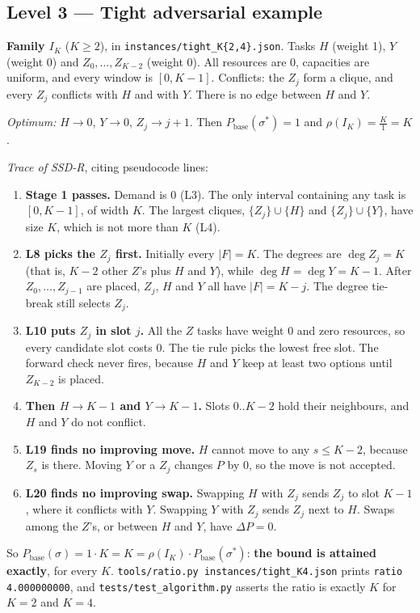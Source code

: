 \subsection{Level 3 --- Tight adversarial example}
\textbf{Family $I_K$} ($K\ge2$), in \texttt{instances/tight\_K\{2,4\}.json}.
Tasks $H$ (weight 1), $Y$ (weight 0) and $Z_0,\dots,Z_{K-2}$ (weight 0).
All resources are $0$, capacities are uniform, and every window is
$[0,K-1]$. Conflicts: the $Z_j$ form a clique, and every $Z_j$ conflicts
with $H$ and with $Y$. There is no edge between $H$ and $Y$.

\emph{Optimum:} $H\to0$, $Y\to0$, $Z_j\to j{+}1$. Then
$P_{\text{base}}(\sigma^\ast)=1$ and $\rho(I_K)=\frac{K}{1}=K$.

\emph{Trace of SSD-R}, citing pseudocode lines:
\begin{enumerate}
\item \textbf{Stage 1 passes.} Demand is 0 (L3). The only interval
  containing any task is $[0,K-1]$, of width $K$. The largest cliques,
  $\{Z_j\}\cup\{H\}$ and $\{Z_j\}\cup\{Y\}$, have size $K$, which is not
  more than $K$ (L4).
\item \textbf{L8 picks the $Z_j$ first.} Initially every $|F|=K$. The
  degrees are $\deg Z_j=K$ (that is, $K{-}2$ other $Z$'s plus $H$ and $Y$),
  while $\deg H=\deg Y=K-1$. After $Z_0,\dots,Z_{j-1}$ are placed, $Z_j$,
  $H$ and $Y$ all have $|F|=K-j$. The degree tie-break still selects
  $Z_j$.
\item \textbf{L10 puts $Z_j$ in slot $j$.} All the $Z$ tasks have weight 0
  and zero resources, so every candidate slot costs 0. The tie rule picks
  the lowest free slot. The forward check never fires, because $H$ and $Y$
  keep at least two options until $Z_{K-2}$ is placed.
\item \textbf{Then $H\to K{-}1$ and $Y\to K{-}1$.} Slots $0..K{-}2$ hold
  their neighbours, and $H$ and $Y$ do not conflict.
\item \textbf{L19 finds no improving move.} $H$ cannot move to any
  $s\le K-2$, because $Z_s$ is there. Moving $Y$ or a $Z_j$ changes $P$ by
  0, so the move is not accepted.
\item \textbf{L20 finds no improving swap.} Swapping $H$ with $Z_j$ sends
  $Z_j$ to slot $K{-}1$, where it conflicts with $Y$. Swapping $Y$ with
  $Z_j$ sends $Z_j$ next to $H$. Swaps among the $Z$'s, or between $H$ and
  $Y$, have $\Delta P=0$.
\end{enumerate}
So $P_{\text{base}}(\sigma)=1\cdot K=K=\rho(I_K)\cdot P_{\text{base}}(\sigma^\ast)$:
\textbf{the bound is attained exactly}, for every $K$.
\texttt{tools/ratio.py instances/tight\_K4.json} prints
\texttt{ratio 4.000000000}, and \texttt{tests/test\_algorithm.py} asserts
the ratio is exactly $K$ for $K=2$ and $K=4$.

